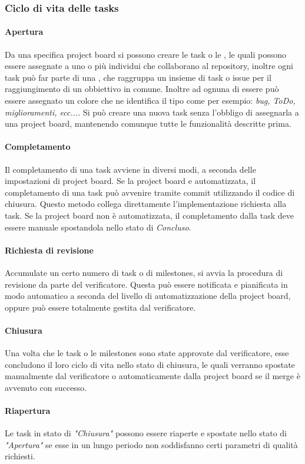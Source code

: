 \subsubsection{Ciclo di vita delle tasks}

	\paragraph{Apertura}
	Da una specifica project board si possono creare le task o le , le quali possono essere assegnate a uno o più individui che collaborano al repository, inoltre ogni task
	può far parte di una , che raggruppa un insieme di task o issue per il raggiungimento di un obbiettivo in comune. 
	Inoltre ad ognuna di essere può essere assegnato un colore che ne identifica il tipo come per esempio: \textit{bug, ToDo, miglioramenti, ecc...}. 
	Si può creare una nuova task senza l'obbligo di assegnarla a una project board, mantenendo comunque tutte le funzionalità descritte prima. 

	\paragraph{Completamento}
	Il completamento di una task avviene in diversi modi, a seconda delle impostazioni di project board. 
	Se la project board e automatizzata, il completamento di una task può avvenire tramite commit utilizzando il codice di chiusura. 
	Questo metodo collega direttamente l'implementazione richiesta alla task. 
	Se la project board non è automatizzata, il completamento dalla task deve essere manuale spostandola nello stato di \textit{Concluso}. 
	
	\paragraph{Richiesta di revisione}
	Accumulate un certo numero di task o di milestones, si avvia la procedura di revisione da parte del verificatore. Questa può essere notificata e pianificata in modo automatico
	a seconda del livello di automatizzazione della project board, oppure può essere totalmente gestita dal verificatore. 
	
	\paragraph{Chiusura}
	Una volta che le task o le milestones sono state approvate dal verificatore, esse concludono il loro ciclo di vita nello stato di chiusura, le quali verranno spostate manualmente dal 
	verificatore o automaticamente dalla project board se il merge è avvenuto con successo. 
	
	\paragraph{Riapertura}
	Le task in stato di \textit{"Chiusura"} possono essere riaperte e spostate nello stato di \textit{"Apertura"} se esse in un lungo periodo non soddisfanno certi parametri di qualità
	richiesti. 
	
